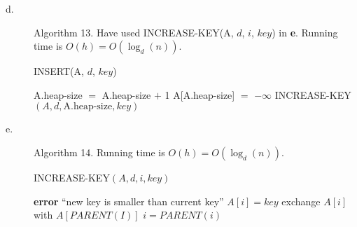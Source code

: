 \documentclass[10pt]{article}
\begin{document}
\begin{description}
\item[d. ] Algorithm 13. Have used INCREASE-KEY(A, $d$, $i$, $key$) in \textbf{e}. Running time is $O(h) = O(\log_d(n))$.
  \begin{algorithm}
    \caption{INSERT(A, $d$, $key$)}
    \begin{algorithmic}[1]
      \STATE A.heap-size $=$ A.heap-size $+$ 1
      \STATE A[A.heap-size] $=$ $-\infty$
      \STATE INCREASE-KEY$(A, d, \textrm{A.heap-size}, key)$
    \end{algorithmic}
  \end{algorithm}

\item[e. ] Algorithm 14. Running time is $O(h) = O(\log_d(n))$.
  \begin{algorithm}
    \caption{INCREASE-KEY$(A, d, i, key)$}
    \begin{algorithmic}[1]
      \STATE \textbf{error} ``new key is smaller than current key''
      \ENDIF
      \STATE $A[i] = key$
      \STATE exchange $A[i]$ with $A[PARENT(I)]$
      \STATE $i = PARENT(i)$
      \ENDWHILE
    \end{algorithmic}
  \end{algorithm}
\end{description}
\end{document}

